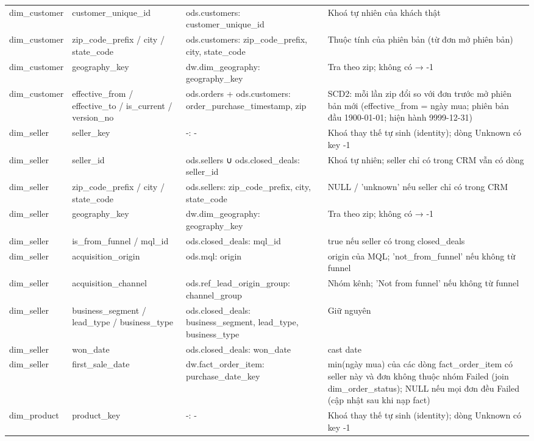 {\begin{longtable}{p{2.4cm}p{3.1cm}p{3.6cm}p{5.4cm}}
dim\_customer & customer\_unique\_id & ods.customers: customer\_unique\_id & Khoá tự nhiên của khách thật \\
dim\_customer & zip\_code\_prefix / city / state\_code & ods.customers: zip\_code\_prefix, city, state\_code & Thuộc tính của phiên bản (từ đơn mở phiên bản) \\
dim\_customer & geography\_key & dw.dim\_geography: geography\_key & Tra theo zip; không có → -1 \\
dim\_customer & effective\_from / effective\_to / is\_current / version\_no & ods.orders + ods.customers: order\_purchase\_timestamp, zip & SCD2: mỗi lần zip đổi so với đơn trước mở phiên bản mới (effective\_from = ngày mua; phiên bản đầu 1900-01-01; hiện hành 9999-12-31) \\
dim\_seller & seller\_key & -: - & Khoá thay thế tự sinh (identity); dòng Unknown có key -1 \\
dim\_seller & seller\_id & ods.sellers ∪ ods.closed\_deals: seller\_id & Khoá tự nhiên; seller chỉ có trong CRM vẫn có dòng \\
dim\_seller & zip\_code\_prefix / city / state\_code & ods.sellers: zip\_code\_prefix, city, state\_code & NULL / 'unknown' nếu seller chỉ có trong CRM \\
dim\_seller & geography\_key & dw.dim\_geography: geography\_key & Tra theo zip; không có → -1 \\
dim\_seller & is\_from\_funnel / mql\_id & ods.closed\_deals: mql\_id & true nếu seller có trong closed\_deals \\
dim\_seller & acquisition\_origin & ods.mql: origin & origin của MQL; 'not\_from\_funnel' nếu không từ funnel \\
dim\_seller & acquisition\_channel & ods.ref\_lead\_origin\_group: channel\_group & Nhóm kênh; 'Not from funnel' nếu không từ funnel \\
dim\_seller & business\_segment / lead\_type / business\_type & ods.closed\_deals: business\_segment, lead\_type, business\_type & Giữ nguyên \\
dim\_seller & won\_date & ods.closed\_deals: won\_date & cast date \\
dim\_seller & first\_sale\_date & dw.fact\_order\_item: purchase\_date\_key & min(ngày mua) của các dòng fact\_order\_item có seller này và đơn không thuộc nhóm Failed (join dim\_order\_status); NULL nếu mọi đơn đều Failed (cập nhật sau khi nạp fact) \\
dim\_product & product\_key & -: - & Khoá thay thế tự sinh (identity); dòng Unknown có key -1 \\

\end{longtable}}
